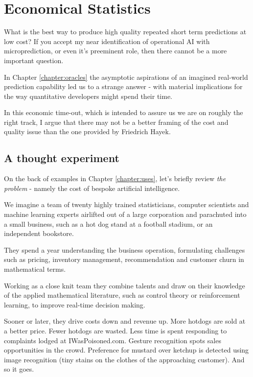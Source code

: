 \chapter{Economical Statistics}
\label{chapter:economics}

What is the best way to produce high quality repeated short term predictions at low cost? If you accept my near identification of operational AI with microprediction, or even it's preeminent role, then there cannot be a more important question.   

In Chapter \ref{chapter:oracles} the asymptotic aspirations of an imagined real-world prediction capability led us to a strange answer - with material implications for the way quantitative developers might spend their time. 

In this economic time-out, which is intended to assure us we are on roughly the right track, I argue that there may not be a better framing of the cost and quality issue than the one provided by Friedrich Hayek. 


\section{A thought experiment}

On the back of examples in Chapter \ref{chapter:uses}, let's briefly review {\em the problem} - namely the cost of bespoke artificial intelligence.

We imagine a team of twenty highly trained statisticians, computer scientists and machine learning experts airlifted out of a large corporation and parachuted into a small business, such as a hot dog stand at a football stadium, or an independent bookstore. 

They spend a year understanding the business operation, formulating challenges such as pricing, inventory management, recommendation and customer churn in mathematical terms. 

Working as a close knit team they combine talents and draw on their knowledge of the applied mathematical literature, such as control theory or reinforcement learning, to improve real-time decision making. 

Sooner or later, they drive costs down and revenue up. More hotdogs are sold at a better price. Fewer hotdogs are wasted. Less time is spent responding to complaints lodged at IWasPoisoned.com. Gesture recognition spots sales opportunities in the crowd. Preference for mustard over ketchup is detected using image recognition (tiny stains on the clothes of the approaching customer). And so it goes.     

